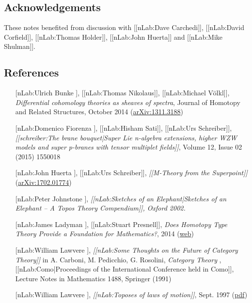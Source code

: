 \documentclass[12pt,titlepage]{article}
\theoremstyle{plain}
\theoremstyle{definition}
\theoremstyle{remark}
\begin{document}
\hypertarget{acknowledgements}{}\subsection*{{Acknowledgements}}\label{acknowledgements}

These notes benefited from discussion with [[nLab:Dave Carchedi]], [[nLab:David Corfield]], [[nLab:Thomas Holder]], [[nLab:John Huerta]] and [[nLab:Mike Shulman]].

\hypertarget{references}{}\subsection*{{References}}\label{references}

\begin{itemize}%
\item [[nLab:Ulrich Bunke]], [[nLab:Thomas Nikolaus]], [[nLab:Michael Völkl]], \emph{Differential cohomology theories as sheaves of spectra}, Journal of Homotopy and Related Structures, October 2014 (\href{http://arxiv.org/abs/1311.3188}{arXiv:1311.3188})


\item [[nLab:Domenico Fiorenza]], [[nLab:Hisham Sati]], [[nLab:Urs Schreiber]], \emph{[[schreiber:The brane bouquet|Super Lie n-algebra extensions, higher WZW models and super p-branes with tensor multiplet fields]]}, Volume 12, Issue 02 (2015) 1550018


\item [[nLab:John Huerta]], [[nLab:Urs Schreiber]], \emph{[[M-Theory from the Superpoint]]} (\href{https://arxiv.org/abs/1702.01774}{arXiv:1702.01774})


\item [[nLab:Peter Johnstone]], \emph{[[nLab:Sketches of an Elephant|Sketches of an Elephant -- A Topos Theory Compendium]], Oxford 2002.}


\item [[nLab:James Ladyman]], [[nLab:Stuart Presnell]], \emph{Does Homotopy Type Theory Provide a Foundation for Mathematics?}, 2014 (\href{http://philsci-archive.pitt.edu/11143/}{web})


\item [[nLab:William Lawvere]], \emph{[[nLab:Some Thoughts on the Future of Category Theory]]} in A. Carboni, M. Pedicchio, G. Rosolini, \emph{Category Theory} , [[nLab:Como|Proceedings of the International Conference held in Como]], Lecture Notes in Mathematics 1488, Springer (1991)


\item [[nLab:William Lawvere]], \emph{[[nLab:Toposes of laws of motion]]}, Sept. 1997 (\href{http://www.acsu.buffalo.edu/~wlawvere/ToposMotion.pdf}{pdf})



\end{itemize}
\end{document}
